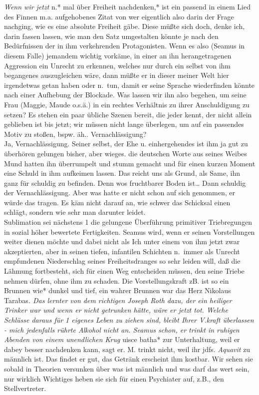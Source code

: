 \documentclass[
]{article}
\begin{document}
\emph{Wenn wir jetzt }n.* mal über Freiheit nachdenken,* ist ein passend
in einem Lied des Finnen m.a. aufgehobenes Zitat von wer eigentlich also
darin der Frage nachging, wie es eine absolute Freiheit gäbe. Diese
müßte sich doch, denke ich, darin fassen lassen, wie man den Satz
umgestalten könnte je nach den Bedürfnissen der in ihm verkehrenden
Protagonisten. Wenn es also (Seamus in diesem Falle) jemandem wichtig
vorkäme, in einer an ihn herangetragenen Aggression ein Unrecht zu
erkennen, welches nur durch ein selbst von ihm begangenes auszugleichen
wäre, dann müßte er in dieser meiner Welt hier irgendetwas getan haben
oder n.~tun, damit er seine Sprache wiederfinden könnte nach einer
Aufhebung der Blockade. Was lassen wir ihn also begehen, um seine Frau
(Maggie, Maude o.s.ä.) in ein rechtes Verhältnis zu ihrer Anschuldigung
zu setzen? Es stehen ein paar übliche Szenen bereit, die jeder kennt,
der nicht allein geblieben ist bis jetzt; wir müssen nicht lange
überlegen, um auf ein passendes Motiv zu stoßen, bspw. äh..
Vernachlässigung?\\
Ja, Vernachlässigung. Seiner selbst, der Ehe u. einhergehendes ist ihm
ja gut zu überhören gelungen bisher, aber wieges. die deutschen Worte
aus seines Weibes Mund hatten ihn überrumpelt und stumm gemacht und für
einen kurzen Moment eine Schuld in ihm aufkeimen lassen. Das reicht uns
als Grund, als Same, ihn ganz für schuldig zu befinden. Denn wos
fruchtbarer Boden ist\ldots{} Dann schuldig der Vernachlässigung. Aber
was hatte er nicht schon auf sich genommen, er würde das tragen. Es käm
nicht darauf an, wie schwer das Schicksal einen schlägt, sondern wie
sehr man darunter leidet.\\
Sublimation sei nächstens 1 die gelungene Überführung primitiver
Triebregungen in sozial höher bewertete Fertigkeiten. Seamus wird, wenn
er seinen Vorstellungen weiter dienen möchte und dabei nicht als Ich
unter einem von ihm jetzt zwar akzeptierten, aber in seinen tiefen,
infantilen Schichten n.~immer als Unrecht empfundenen Niederschlag
seines Freiheitsdranges so sehr leiden will, daß die Lähmung
fortbesteht, sich für einen Weg entscheiden müssen, den seine Triebe
nehmen dürfen, ohne ihm zu schaden. Die Vorstellungskraft zB. ist so ein
Brunnen wie* dunkel und tief, ein wahrer Brunnen war das Herz Nikolaus
Tarabas\textquotesingle{}\emph{. Das lernter von dem richtigen Joseph
Roth dazu, der ein heiliger Trinker war und wenn er nicht getrunken
hätte, wäre er jetzt tot. Welche Schlüsse daraus für 1 eigenes Leben zu
ziehen sind, bleibt Ihrer V.kraft überlassen - mich jedenfalls rührte
Alkohol nicht an. Seamus schon, er trinkt in ruhigen Abenden von einem
unendlichen Krug }uisce batha* zur Unterhaltung, weil er dabey besser
nachdenken kann, sagt er. M. trinkt nicht, weil ihr jdfs. \emph{Aquavit}
zu männlich ist. Das findet er gut, das Getränk erscheint ihm kostbar.
Wir sehen sie sobald in Theorien versunken über was ist männlich und was
darf das wert sein, nur wirklich Wichtiges heben sie sich für einen
Psychiater auf, z.B., den Stellvertreter.
\end{document}
